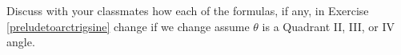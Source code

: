 {Discuss with your classmates how each of the formulas, if any, in Exercise \ref{preludetoarctrigsine} change if we change assume $\theta$ is a Quadrant II, III, or IV angle.}
{}
